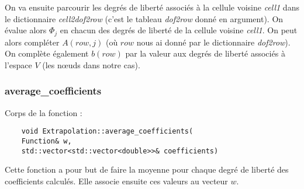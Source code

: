 On va ensuite parcourir les degrés de liberté associés à la cellule voisine \textit{cell1} dans le dictionnaire \textit{cell2dof2row} (c'est le tableau \textit{dof2row} donné en argument). On évalue alors $\Phi_j$ en chacun des degrés de liberté de la cellule voisine \textit{cell1}. On peut alors compléter $A(row,j)$ (où $row$ nous ai donné par le dictionnaire \textit{dof2row}). On complète également $b(row)$ par la valeur aux degrés de liberté associés à l'espace $V$ (les nœuds dans notre cas). 

\subsubsection*{average\_coefficients}
\label{average_coefficients}

Corps de la fonction :

\begin{lstlisting}
	void Extrapolation::average_coefficients(
	Function& w,
	std::vector<std::vector<double>>& coefficients)	
\end{lstlisting}

Cette fonction a pour but de faire la moyenne pour chaque degré de liberté des coefficients calculés. Elle associe ensuite ces valeurs au vecteur $w$.

